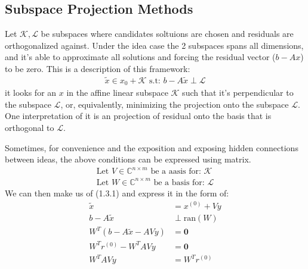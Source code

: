 \documentclass[]{article}
\theoremstyle{definition}
\begin{document}
    \subsection{Subspace Projection Methods}
        Let $\mathcal K, \mathcal L$ be subspaces where candidates soltuions are chosen and residuals are orthogonalized against. Under the idea case the 2 subspaces spans all dimensions, and it's able to approximate all solutions and forcing the residual vector ($b - Ax$) to be zero. This is a description of this framework: 
        \begin{align}
            \tilde{x} \in x_0 + \mathcal{K} \text{ s.t: } b - A\tilde{x} \perp \mathcal{L}
        \end{align}
        it looks for an $x$ in the affine linear subspace $\mathcal{K}$ such that it's perpendicular to the subspace $\mathcal{L}$, or, equivalently, minimizing the projection onto the subspace $\mathcal{L}$. One interpretation of it is an projection of residual onto the basis that is orthogonal to $\mathcal L$. 
        \par
        Sometimes, for convenience and the exposition and exposing hidden connections between ideas, the above conditions can be expressed using matrix. 
        \begin{align}
            \text{Let } V \in \mathbb{C}^{n\times m} \text{ be a aasis for: }\mathcal{K}
            \\
            \text{Let } W \in \mathbb{C}^{n\times m} \text{ be a basis for: } \mathcal{L}
        \end{align}
        We can then make us of (1.3.1) and express it in the form of: 
        \begin{align}
            \tilde{x} &= x^{(0)} + Vy
            \\
            b - A\tilde{x}  &\perp \text{ran}(W)
            \\
            W^T(b - A\tilde{x} - AVy) &= \mathbf{0}
            \\
            W^Tr^{(0)} - W^TAVy&= \mathbf{0}
            \\
            W^TAVy &= W^Tr^{(0)}
        \end{align}
\end{document}

